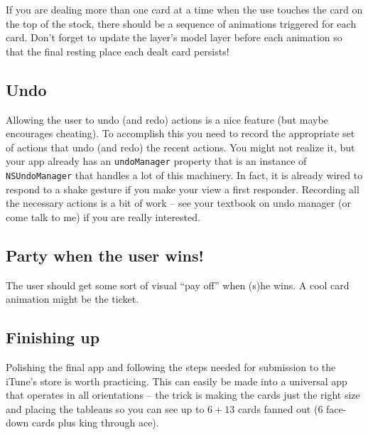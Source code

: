 \documentclass[11pt]{article}
\begin{document}
If you are dealing more than one card at a time when 
the use touches the card on the top of the stock, there
should be a sequence of animations triggered
for each card. Don't forget to update the layer's model
layer before each animation so that the final resting
place each dealt card persists!

\subsection{Undo}

Allowing the user to undo (and redo) actions is a nice feature (but
maybe encourages cheating).
To accomplish this you need to
record the appropriate set of actions that undo (and redo) the
recent actions. You might not realize it, but your app already has
an {\tt undoManager} property that is an instance of
{\tt NSUndoManager} that handles a lot of this machinery.
In fact, it is already wired to respond to a shake gesture if you
make your view a first responder.
Recording all the necessary actions is a bit of work -- see your textbook
on undo manager (or come talk to me) if you are really interested.

\subsection{Party when the user wins!}

The user should get some sort of visual ``pay off'' when
(s)he wins. A cool card animation might be the ticket.

\subsection{Finishing up}

Polishing the final app and following the steps needed
for submission to the iTune's store is worth practicing.
This can easily be made into a universal app that operates
in all orientations -- the trick
is making the cards just the right size and placing the
tableaus so you can see up to $6 + 13$ cards fanned out
(6 face-down cards plus king through ace).
\end{document}
